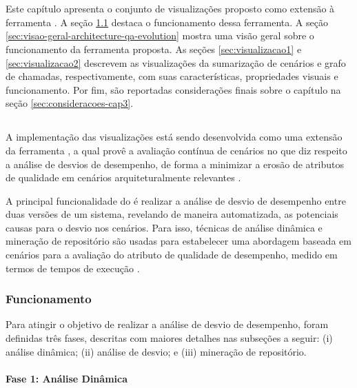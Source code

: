 \chapter{\toolName} \label{ch:pqae}

Este capítulo apresenta o conjunto de visualizações proposto como extensão à ferramenta \textit{\perfMinerName}. A seção \ref{sec:perfminer} destaca o funcionamento dessa ferramenta. A seção \ref{sec:visao-geral-architecture-qa-evolution} mostra uma visão geral sobre o funcionamento da ferramenta proposta. As seções \ref{sec:visualizacao1} e \ref{sec:visualizacao2} descrevem as visualizações da sumarização de cenários e grafo de chamadas, respectivamente, com suas características, propriedades visuais e funcionamento. Por fim, são reportadas considerações finais sobre o capítulo na seção \ref{sec:consideracoes-cap3}.

\section{\perfMinerName} \label{sec:perfminer}

A implementação das visualizações está sendo desenvolvida como uma extensão da ferramenta \textit{\perfMinerName}, a qual provê a avaliação contínua de cenários no que diz respeito a análise de desvios de desempenho, de forma a minimizar a erosão de atributos de qualidade em cenários arquiteturalmente relevantes \cite{Pinto2015}.

A principal funcionalidade do \textit{\perfMinerName} é realizar a análise de desvio de desempenho entre duas versões de um sistema, revelando de maneira automatizada, as potenciais causas para o desvio nos cenários. Para isso, técnicas de análise dinâmica e mineração de repositório são usadas para estabelecer uma abordagem baseada em cenários para a avaliação do atributo de qualidade de desempenho, medido em termos de tempos de execução \cite{Pinto2015}.

\subsection{Funcionamento} \label{subsec:funcionamento-perfminer}

Para atingir o objetivo de realizar a análise de desvio de desempenho, foram definidas três fases, descritas com maiores detalhes nas subseções a seguir: (i) análise dinâmica; (ii) análise de desvio; e (iii) mineração de repositório.

\subsubsection{Fase 1: Análise Dinâmica} \label{subsec:fase1}

